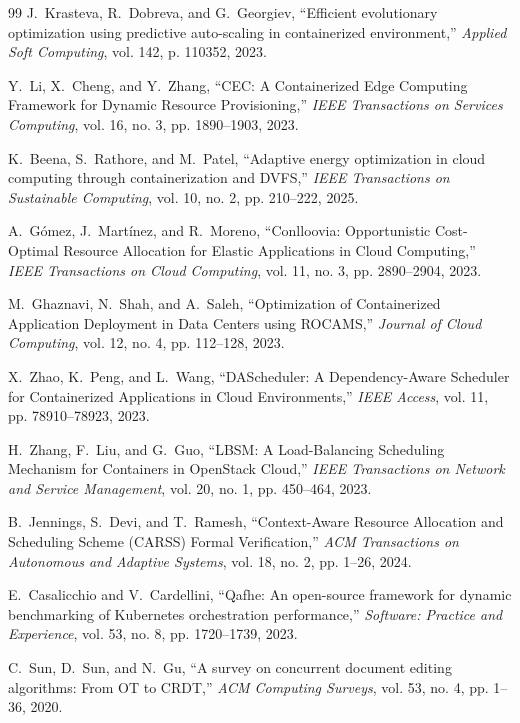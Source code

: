 \documentclass[12pt,a4paper]{report}
\begin{document}
{\begin{thebibliography}{99}
J.~Krasteva, R.~Dobreva, and G.~Georgiev,
``Efficient evolutionary optimization using predictive auto-scaling in containerized environment,''
\textit{Applied Soft Computing}, vol. 142, p. 110352, 2023.

Y.~Li, X.~Cheng, and Y.~Zhang,
``CEC: A Containerized Edge Computing Framework for Dynamic Resource Provisioning,''
\textit{IEEE Transactions on Services Computing}, vol. 16, no. 3, pp. 1890--1903, 2023.

K.~Beena, S.~Rathore, and M.~Patel,
``Adaptive energy optimization in cloud computing through containerization and DVFS,''
\textit{IEEE Transactions on Sustainable Computing}, vol. 10, no. 2, pp. 210--222, 2025.

A.~G\'omez, J.~Mart\'inez, and R.~Moreno,
``Conlloovia: Opportunistic Cost-Optimal Resource Allocation for Elastic Applications in Cloud Computing,''
\textit{IEEE Transactions on Cloud Computing}, vol. 11, no. 3, pp. 2890--2904, 2023.

M.~Ghaznavi, N.~Shah, and A.~Saleh,
``Optimization of Containerized Application Deployment in Data Centers using ROCAMS,''
\textit{Journal of Cloud Computing}, vol. 12, no. 4, pp. 112--128, 2023.

X.~Zhao, K.~Peng, and L.~Wang,
``DAScheduler: A Dependency-Aware Scheduler for Containerized Applications in Cloud Environments,''
\textit{IEEE Access}, vol. 11, pp. 78910--78923, 2023.

H.~Zhang, F.~Liu, and G.~Guo,
``LBSM: A Load-Balancing Scheduling Mechanism for Containers in OpenStack Cloud,''
\textit{IEEE Transactions on Network and Service Management}, vol. 20, no. 1, pp. 450--464, 2023.

B.~Jennings, S.~Devi, and T.~Ramesh,
``Context-Aware Resource Allocation and Scheduling Scheme (CARSS) Formal Verification,''
\textit{ACM Transactions on Autonomous and Adaptive Systems}, vol. 18, no. 2, pp. 1--26, 2024.

E.~Casalicchio and V.~Cardellini,
``Qafhe: An open-source framework for dynamic benchmarking of Kubernetes orchestration performance,''
\textit{Software: Practice and Experience}, vol. 53, no. 8, pp. 1720--1739, 2023.

C.~Sun, D.~Sun, and N.~Gu,
``A survey on concurrent document editing algorithms: From OT to CRDT,''
\textit{ACM Computing Surveys}, vol. 53, no. 4, pp. 1--36, 2020.



\end{thebibliography}}
\end{document}
